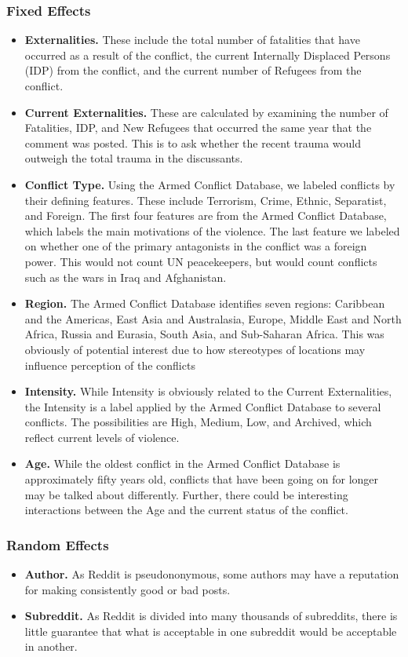 \subsubsection{Fixed Effects}
\begin{itemize}
\item{\textbf{Externalities.} These include the total number of fatalities that have occurred as a result of the conflict, the current Internally Displaced Persons (IDP) from the conflict, and the current number of Refugees from the conflict.}
\item{\textbf{Current Externalities.} These are calculated by examining the number of Fatalities, IDP, and New Refugees that occurred the same year that the comment was posted. This is to ask whether the recent trauma would outweigh the total trauma in the discussants.}
\item{\textbf{Conflict Type.} Using the Armed Conflict Database, we labeled conflicts by their defining features. These include Terrorism, Crime, Ethnic, Separatist, and Foreign. The first four features are from the Armed Conflict Database, which labels the main motivations of the violence. The last feature we labeled on whether one of the primary antagonists in the conflict was a foreign power. This would not count UN peacekeepers, but would count conflicts such as the wars in Iraq and Afghanistan.}
\item{\textbf{Region.} The Armed Conflict Database identifies seven regions: Caribbean and the Americas, East Asia and Australasia, Europe, Middle East and North Africa, Russia and Eurasia, South Asia, and Sub-Saharan Africa. This was obviously of potential interest due to how stereotypes of locations may influence perception of the conflicts}
\item{\textbf{Intensity.} While Intensity is obviously related to the Current Externalities, the Intensity is a label applied by the Armed Conflict Database to several conflicts. The possibilities are High, Medium, Low, and Archived, which reflect current levels of violence.}
\item{\textbf{Age.} While the oldest conflict in the Armed Conflict Database is approximately fifty years old, conflicts that have been going on for longer may be talked about differently. Further, there could be interesting interactions between the Age and the current status of the conflict.}   
\end{itemize} 

\subsubsection{Random Effects}
\begin{itemize}
\item{\textbf{Author.} As Reddit is pseudononymous, some authors may have a reputation for making consistently good or bad posts.}
\item{\textbf{Subreddit.} As Reddit is divided into many thousands of subreddits, there is little guarantee that what is acceptable in one subreddit would be acceptable in another.}
\end{itemize}
